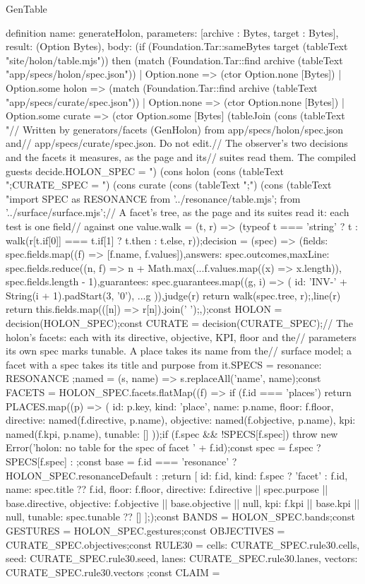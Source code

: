 \begin{lexlean}{GenTable}
\begin{semanticmodule}
definition{
  name: generateHolon,
  parameters: [archive : Bytes, target : Bytes],
  result: (Option Bytes),
  body: (if (Foundation.Tar::sameBytes target (tableText "site/holon/table.mjs")) then (match (Foundation.Tar::find archive (tableText "app/specs/holon/spec.json"))
    | Option.none => (ctor Option.none [Bytes])
    | Option.some holon => (match (Foundation.Tar::find archive (tableText "app/specs/curate/spec.json"))
      | Option.none => (ctor Option.none [Bytes])
      | Option.some curate => (ctor Option.some [Bytes] (tableJoin (cons (tableText "// Written by generators/facets (GenHolon) from app/specs/holon/spec.json and\n// app/specs/curate/spec.json. Do not edit.\n// The observer's two decisions and the facets it measures, as the page and its\n// suites read them. The compiled guests decide.\n\nconst HOLON_SPEC = ") (cons holon (cons (tableText ";\n\nconst CURATE_SPEC = ") (cons curate (cons (tableText ";\n\n") (cons (tableText "import { SPEC as RESONANCE } from '../resonance/table.mjs'; from '../surface/surface.mjs';\n\n// A facet's tree, as the page and its suites read it: each test is one field\n// against one value.\nconst walk = (t, r) => (typeof t === 'string' ? t : walk(r[t.if[0]] === t.if[1] ? t.then : t.else, r));\nconst decision = (spec) => ({\n  fields: spec.fields.map((f) => [f.name, f.values]),\n  answers: spec.outcomes,\n  maxLine: spec.fields.reduce((n, f) => n + Math.max(...f.values.map((x) => x.length)), spec.fields.length - 1),\n  guarantees: spec.guarantees.map((g, i) => ({ id: 'INV-' + String(i + 1).padStart(3, '0'), ...g })),\n  judge(r) {\n    return walk(spec.tree, r);\n  },\n  line(r) {\n    return this.fields.map(([n]) => r[n]).join(' ');\n  },\n});\n\nexport const HOLON = decision(HOLON_SPEC);\nexport const CURATE = decision(CURATE_SPEC);\n\n// The holon's facets: each with its directive, objective, KPI, floor and the\n// parameters its own spec marks tunable. A place takes its name from the\n// surface model; a facet with a spec takes its title and purpose from it.\nconst SPECS = { resonance: RESONANCE };\nconst named = (s, name) => s.replaceAll('{name}', name);\nexport const FACETS = HOLON_SPEC.facets.flatMap((f) => {\n  if (f.id === 'places') {\n    return PLACES.map((p) => ({ id: p.key, kind: 'place', name: p.name, floor: f.floor, directive: named(f.directive, p.name), objective: named(f.objective, p.name), kpi: named(f.kpi, p.name), tunable: [] }));\n  }\n  if (f.spec && !SPECS[f.spec]) throw new Error('holon: no table for the spec of facet ' + f.id);\n  const spec = f.spec ? SPECS[f.spec] : {};\n  const base = f.id === 'resonance' ? HOLON_SPEC.resonanceDefault : {};\n  return [{ id: f.id, kind: f.spec ? 'facet' : f.id, name: spec.title ?? f.id, floor: f.floor, directive: f.directive || spec.purpose || base.directive, objective: f.objective || base.objective || null, kpi: f.kpi || base.kpi || null, tunable: spec.tunable ?? [] }];\n});\nexport const BANDS = HOLON_SPEC.bands;\nexport const GESTURES = HOLON_SPEC.gestures;\nexport const OBJECTIVES = CURATE_SPEC.objectives;\nexport const RULE30 = { cells: CURATE_SPEC.rule30.cells, seed: CURATE_SPEC.rule30.seed, lanes: CURATE_SPEC.rule30.lanes, vectors: CURATE_SPEC.rule30.vectors };\nexport const CLAIM = }
\end{semanticmodule}
\end{lexlean}
